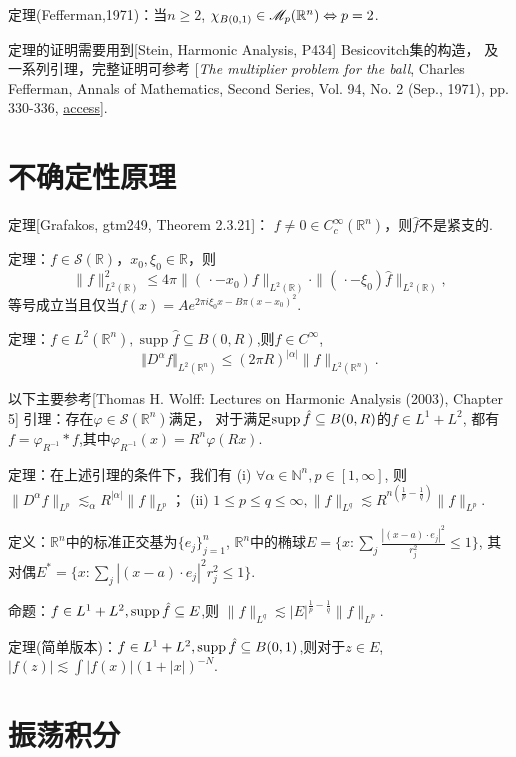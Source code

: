 定理(Fefferman,1971)：当$n\geq 2$,
$\chi_{B(0,1)}\in \mathscr{M}_p(\mathbb{R}^n)\Leftrightarrow p=2$.

定理的证明需要用到[Stein, Harmonic Analysis, P434] Besicovitch集的构造，
及一系列引理，完整证明可参考
[\textit{The multiplier problem for the ball}, Charles Fefferman, 
Annals of Mathematics, Second Series, Vol. 94, No. 2 (Sep., 1971), pp. 330-336, 
\href{https://www.jstor.org/stable/1970864}{access}].

\section{不确定性原理}

定理[Grafakos, gtm249, Theorem 2.3.21]：
$f\neq 0\in C_c^\infty(\mathbb{R}^n)$，则$\hat{f}$不是紧支的.

定理：$f\in \mathscr{S}(\mathbb{R})$，$x_0,\xi_0\in \mathbb{R}$，则
$$\|f\|^2_{L^2(\mathbb{R})}\leq 4\pi \|(\,\cdot -x_0)f\|_{L^2(\mathbb{R})}\cdot 
\|(\,\cdot -\xi_0)\hat{f}\|_{L^2(\mathbb{R})},$$
等号成立当且仅当$f(x)=Ae^{2\pi i \xi_0x-B\pi (x-x_0)^2}.$

定理：$f\in L^2(\mathbb{R}^n),\operatorname{supp} \hat{f} \subseteq B(0,R)$,则$f\in C^\infty$, 
$$\Vert D^\alpha f\Vert _{L^2(\mathbb{R}^n)}
\leq (2\pi R)^{|\alpha|}\|f\|_{L^2(\mathbb{R}^n)}.$$

以下主要参考[Thomas H. Wolff: Lectures on Harmonic Analysis (2003), Chapter 5]
引理：存在$\varphi\in \mathscr{S}(\mathbb{R}^n)$满足，
对于满足$\operatorname{supp}\hat{f} \subseteq B(0,R)$的$f\in L^1+L^2$,
都有$f=\varphi_{R^{-1}}*f$,其中$\varphi_{R^{-1}}(x)=R^n\varphi(Rx).$

定理：在上述引理的条件下，我们有
(i) $\forall \alpha\in \mathbb{N}^n, p\in [1,\infty]$,
则$\|D^\alpha f\|_{L^p}\lesssim_\alpha R^{|\alpha|}\|f\|_{L^p}$；
(ii) $1\leq p\leq  q\leq \infty,\|f\|_{L^q}\lesssim 
R^{n(\frac{1}{p}-\frac{1}{q})}\|f\|_{L^p}$.

定义：$\mathbb{R}^n$中的标准正交基为$\{ e_j \}_{j=1}^n$, 
$\mathbb{R}^n$中的椭球$E=\{ x:\sum _{j}\frac{|(x-a)\cdot e_j|^2 }{r_j^2} \leq 1\}$,
其对偶$E^*=\{ x:\sum _{j}|(x-a)\cdot e_j|^2 r_j^2 \leq 1\}$.

命题：$f\in L^1+L^2,\operatorname{supp}\hat{f} \subseteq E$,则
$\|f\| _{L^q}\lesssim |E|^{\frac{1}{p}-\frac{1}{q}}\|f\|_{L^p}.$

定理(简单版本)：$f\in L^1+L^2, \operatorname{supp}\hat{f} \subseteq B(0,1)$,则对于$z\in E$,
$|f(z)| \lesssim \int |f(x)| (1+|x|)^{-N}.$

\section{振荡积分}

